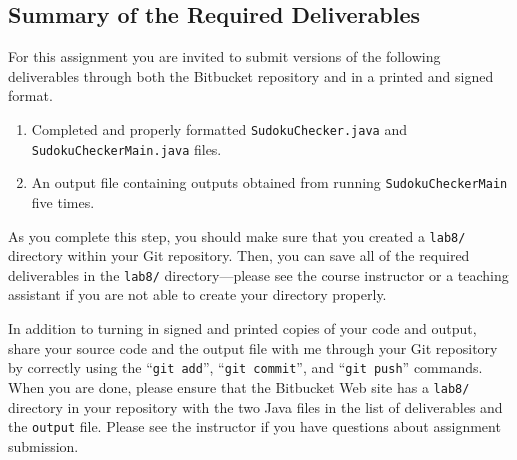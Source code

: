 \subsection*{Summary of the Required Deliverables}
\vspace{-0.05in}

For this assignment you are invited to submit versions of the following deliverables through both the Bitbucket
repository and in a printed and signed format.

\vspace{-0.05in}
\begin{enumerate}
    \setlength{\itemsep}{0pt}
  \item Completed and properly formatted {\tt SudokuChecker.java} and {\tt SudokuCheckerMain.java} files.

  \item An output file containing outputs obtained from running {\tt SudokuCheckerMain} five times.

\end{enumerate}
\vspace{-0.05in}

\noindent As you complete this step, you should make sure that you created a {\tt lab8/} directory within your Git
repository.  Then, you can save all of the required deliverables in the {\tt lab8/} directory---please see the course
instructor or a teaching assistant if you are not able to create your directory properly.

\noindent In addition to turning in signed and printed copies of your code and output, share your source code and the output
file with me through your Git repository by correctly using the ``{\tt git add}'', ``{\tt git commit}'', and ``{\tt git
  push}'' commands. When you are done, please ensure that the Bitbucket Web site has a {\tt lab8/} directory in your
repository with the two Java files in the list of deliverables and the {\tt output} file. Please see the instructor
if you have questions about assignment submission.


